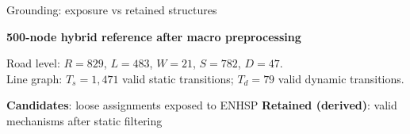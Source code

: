 \documentclass[aspectratio=169,10pt,t]{beamer}
\begin{document}
	\begin{frame}{Grounding: exposure vs retained structures}
		\centering
		{\small\textbf{500-node hybrid reference after macro preprocessing}\par}
		\vspace{0.05cm}
		{\scriptsize
			Road level: \(R=829\), \(L=483\), \(W=21\), \(S=782\), \(D=47\).\\
			Line graph: \(T_s=1{,}471\) valid static transitions;
			\(T_d=79\) valid dynamic transitions.}
		
		\vspace{0.12cm}
		{\scriptsize
			\textbf{Candidates}: loose assignments exposed to ENHSP
			\qquad
			\textbf{Retained (derived)}: valid mechanisms after static filtering\par}
		

\end{frame}
\end{document}
